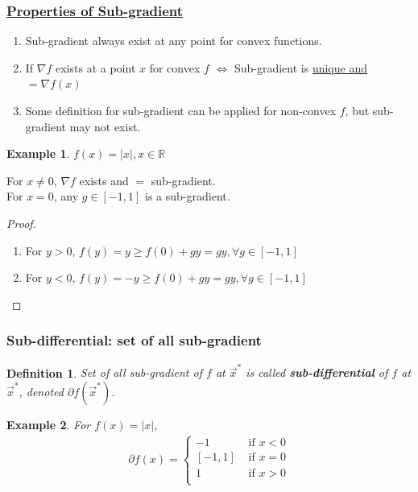 \documentclass[11pt,a4paper]{article}
\newtheorem{example}{Example}
\newtheorem{definition}{Definition}
\begin{document}
\subsubsection*{\underline{Properties of Sub-gradient}}
\begin{enumerate}[1)]
    \item Sub-gradient always exist at any point for convex functions.
    \item If $\nabla f$ exists at a point $x$ for convex $f$ $\Leftrightarrow$ Sub-gradient is \underline{unique and $=\nabla f(x)$}
    \item Some definition for sub-gradient can be applied for non-convex $f$, but sub-gradient may not exist.
\end{enumerate}

\begin{example}
$f(x)=|x|,x\in \mathbb{R}$
\end{example}
For $x\neq 0$, $\nabla f$ exists and $=$ sub-gradient.\\
For $x=0$, any $g\in[-1,1]$ is a sub-gradient.
\begin{proof}\quad
\begin{enumerate}[(1)]
    \item For $y>0$, $f(y)=y\geq f(0)+gy=gy,\forall g\in[-1,1]$
    \item For $y<0$, $f(y)=-y\geq f(0)+gy=gy,\forall g\in[-1,1]$
\end{enumerate}
\end{proof}

\subsubsection{Sub-differential: set of all sub-gradient}
\begin{definition}
    Set of all sub-gradient of $f$ at $\vec{x}^*$ is called \textbf{sub-differential} of $f$ at $\vec{x}^*$, denoted $\partial f(\vec{x}^*)$.
\end{definition}
\begin{example}
For $f(x)=|x|$,
\begin{equation}
    \begin{aligned}
        \partial f(x)=\left\{\begin{matrix}
            -1&\text{ if }x<0\\
            [-1,1]&\text{ if }x=0\\
            1&\text{ if }x>0\\
        \end{matrix}\right.
    \end{aligned}
    \nonumber
\end{equation}
\end{example}
\end{document}
